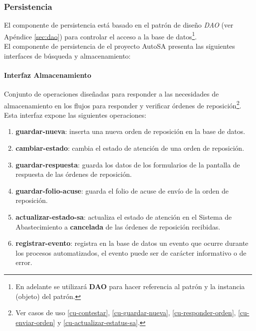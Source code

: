 \subsubsection{Persistencia}
El componente de persistencia está basado en el patrón de diseño \textit{DAO} (ver Apéndice \ref{sec:dao}) para controlar el acceso a la base de datos\footnote{En adelante se utilizará \textbf{DAO} para hacer referencia al patrón y la instancia (objeto) del patrón.}.\\
El componente de persistencia de el proyecto AutoSA presenta las siguientes interfaces de búsqueda y almacenamiento:
\paragraph{\indent Interfaz Almacenamiento\\}
Conjunto de operaciones diseñadas para responder a las necesidades de almacenamiento en los flujos para responder y verificar órdenes de reposición\footnote{Ver casos de uso \ref{cu-contestar}, \ref{cu-guardar-nueva}, \ref{cu-responder-orden}, \ref{cu-enviar-orden} y \ref{cu-actualizar-estatus-sa}.}. Esta interfaz expone las siguientes operaciones:
\begin{enumerate}
	\item \textbf{guardar-nueva}: inserta una nueva orden de reposición en la base de datos.
	\item \textbf{cambiar-estado}: cambia el estado de atención de una orden de reposición.
	\item \textbf{guardar-respuesta}: guarda los datos de los formularios de la pantalla de respuesta de las órdenes de reposición.
	\item \textbf{guardar-folio-acuse}: guarda el folio de acuse de envío de la orden de reposición.
	\item \textbf{actualizar-estado-sa}: actualiza el estado de atención en el Sistema de Abastecimiento a \textbf{cancelada} de las órdenes de reposición recibidas.
	\item \textbf{registrar-evento}: registra en la base de datos un evento que ocurre durante los procesos automatizados, el evento puede ser de carácter informativo o de error.
\end{enumerate}


